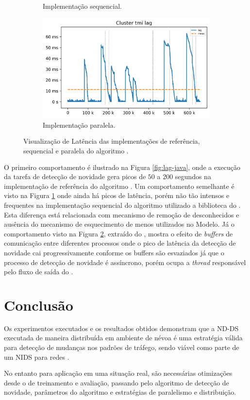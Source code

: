 \begin{figure}[h]
\begin{subfigure}{0.48\textwidth}
    \caption{Implementação sequencial.}
    \label{fig:lag-serial}
  \end{subfigure}
  \begin{subfigure}{0.48\textwidth}
    \centering
    \includegraphics[width=1\linewidth]{experiments/lag-mfog.png}
    \caption{Implementação paralela.}
    \label{fig:lag-mfog}
  \end{subfigure}
  \caption{Visualização de Latência das implementações de referência, sequencial
  e paralela do algoritmo \minas.}
  \label{fig:lag}
\end{figure}

O primeiro comportamento é ilustrado na Figura \ref{fig:lag-java}, onde a execução
da tarefa de detecção de novidade gera picos de $50$ a $200$ segundos
na implementação de referência do algoritmo \minas.
Um comportamento semelhante é visto na Figura \ref{fig:lag-serial} onde ainda há
picos de latência, porém não tão intensos e frequentes na implementação sequencial
do algoritmo \minas utilizado a biblioteca do \mfog.
Esta diferença está relacionada com mecanismo de remoção de desconhecidos e
ausência do mecanismo de esquecimento de \mclusters menos utilizados no Modelo.
Já o comportamento visto na Figura \ref{fig:lag-mfog}, extraído do \mfog, mostra o efeito de
\emph{buffers} de comunicação entre diferentes processos onde o pico de latência
da detecção de novidade cai progressivamente conforme os buffers são esvaziados
já que o processo de detecção de novidade é assíncrono, porém ocupa a \emph{thread}
responsável pelo fluxo de saída do \mfog.

\section{Conclusão}
\label{sec:exp-conclusao}

Os experimentos executados e os resultados obtidos demonstram que a \acf{ND-DS}
executada de maneira distribuída em ambiente de névoa é uma estratégia
válida para detecção de mudanças nos padrões de tráfego, sendo viável como parte
de um \acf{NIDS} para redes \iot.

No entanto para aplicação em uma situação real, são necessárias otimizações
desde o \dataset de treinamento e avaliação, passando pelo algoritmo de detecção
de novidade, parâmetros do algoritmo e estratégias de paralelismo e
distribuição.
